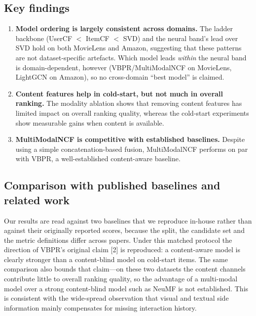 \documentclass[11pt,a4paper]{article}
\begin{document}
\subsection{Key findings}
\begin{enumerate}[leftmargin=2em,itemsep=2pt,topsep=3pt]
  \item \textbf{Model ordering is largely consistent across domains.} The ladder
        backbone (UserCF $<$ ItemCF $<$ SVD) and the neural band's lead over SVD
        hold on both MovieLens and Amazon, suggesting that these patterns are
        not dataset-specific artefacts. Which model leads \emph{within} the
        neural band is domain-dependent, however (VBPR/MultiModalNCF on
        MovieLens, LightGCN on Amazon), so no cross-domain ``best model'' is
        claimed.
  \item \textbf{Content features help in cold-start, but not much in overall
        ranking.} The modality ablation shows that removing content features has
        limited impact on overall ranking quality, whereas the cold-start
        experiments show measurable gains when content is available.
  \item \textbf{MultiModalNCF is competitive with established baselines.}
        Despite using a simple concatenation-based fusion, MultiModalNCF
        performs on par with VBPR, a well-established content-aware baseline.
\end{enumerate}

\subsection{Comparison with published baselines and related work}
Our results are read against two baselines that we reproduce in-house rather
than against their originally reported scores, because the split, the candidate
set and the metric definitions differ across papers. Under this matched
protocol the direction of VBPR's original claim [2] is reproduced: a content-aware
model is clearly stronger than a content-blind model on cold-start items. The
same comparison also bounds that claim---on these two datasets the content
channels contribute little to overall ranking quality, so the advantage of a
multi-modal model over a strong content-blind model such as NeuMF is not
established. This is consistent with the wide-spread observation that visual and
textual side information mainly compensates for missing interaction history.
\end{document}
